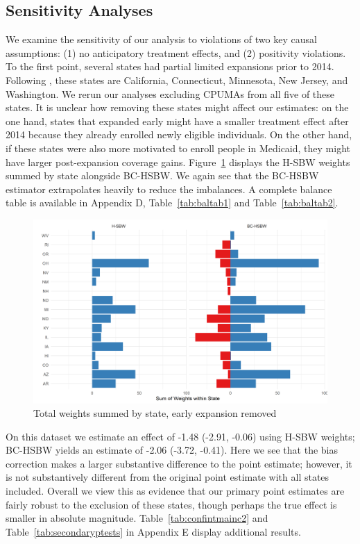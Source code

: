 \documentclass{article}
\begin{document}
\subsection{Sensitivity Analyses} \label{sssec:sensitivity}

We examine the sensitivity of our analysis to violations of two key causal assumptions: (1) no anticipatory treatment effects, and (2) positivity violations. To the first point, several states had partial limited expansions prior to 2014. Following \cite{frean2017premium}, these states are California, Connecticut, Minnesota, New Jersey, and Washington. We rerun our analyses excluding CPUMAs from all five of these states. It is unclear how removing these states might affect our estimates: on the one hand, states that expanded early might have a smaller treatment effect after 2014 because they already enrolled newly eligible individuals. On the other hand, if these states were also more motivated to enroll people in Medicaid, they might have larger post-expansion coverage gains. Figure~\ref{fig:weightsbystatec2} displays the H-SBW weights summed by state alongside BC-HSBW. We again see that the BC-HSBW estimator extrapolates heavily to reduce the imbalances. A complete balance table is available in Appendix D, Table~\ref{tab:baltab1} and Table~\ref{tab:baltab2}.

\begin{figure}
\begin{center}
    \caption{Total weights summed by state, early expansion removed}
    \label{fig:weightsbystatec2}
    \includegraphics[scale=0.6]{01_Plots/weights-by-state-hsbw-c2.png}
\end{center}
\end{figure}

On this dataset we estimate an effect of -1.48 (-2.91, -0.06) using H-SBW weights; BC-HSBW yields an estimate of -2.06 (-3.72, -0.41). Here we see that the bias correction makes a larger substantive difference to the point estimate; however, it is not substantively different from the original point estimate with all states included. Overall we view this as evidence that our primary point estimates are fairly robust to the exclusion of these states, though perhaps the true effect is smaller in absolute magnitude. Table~\ref{tab:confintmainc2} and Table~\ref{tab:secondaryptests} in Appendix E display additional results. 
\end{document}
